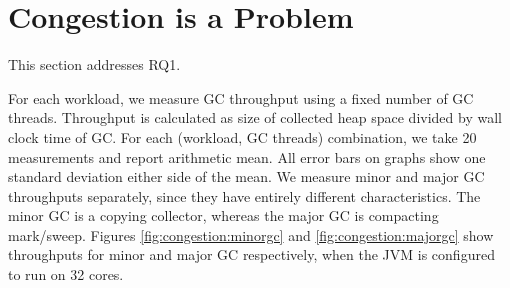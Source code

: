 \section{Congestion is a Problem}
\label{sec:congestion}

This section addresses RQ1.

For each workload, we measure GC throughput using a fixed number of 
GC threads.
Throughput is calculated as size of collected heap space divided by wall clock time of GC.
For each (workload, GC threads) combination, we take 20 measurements and
report arithmetic mean. All error bars on graphs show one standard deviation 
either side of the mean.
We measure minor and major GC throughputs separately, since they have entirely
different characteristics. The minor GC is a copying collector, whereas the
major GC is compacting mark/sweep.
Figures \ref{fig:congestion:minorgc} and \ref{fig:congestion:majorgc}
show throughputs for minor and major GC respectively, when the JVM is
configured to run on 32 cores.